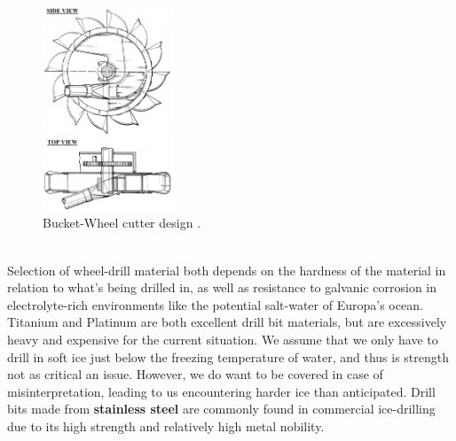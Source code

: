 \begin{figure}[htb]
	\centering
	\includegraphics[width=0.35\textwidth]{figures/Rasmus/WheelCutter}
	\caption{Bucket-Wheel cutter design \cite{Vonbucket}.
	\label{fig:WheelCut}}
\end{figure}
\\Selection of wheel-drill material both depends on the hardness of the material in relation to what's being drilled in, as well as resistance to galvanic corrosion in electrolyte-rich environments like the potential salt-water of Europa's ocean. Titanium and Platinum are both excellent drill bit materials, but are excessively heavy and expensive for the current situation. We assume that we only have to drill in soft ice just below the freezing temperature of water, and thus is strength not as critical an issue. However, we do want to be covered in case of misinterpretation, leading to us encountering harder ice than anticipated. Drill bits made from \textbf{stainless steel} are commonly found in commercial ice-drilling due to its high strength and relatively high metal nobility\cite{Corrosion}.\\
\\

